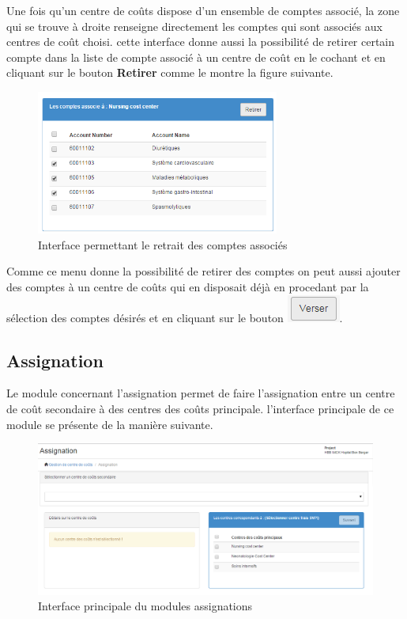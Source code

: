 \documentclass[12pt,a4paper]{report}
\begin{document}
Une fois qu'un centre de coûts dispose d'un ensemble de comptes associé, la zone qui se trouve à droite renseigne directement les comptes qui sont associés aux centres de coût choisi. cette interface donne aussi la possibilité de retirer certain compte dans la liste de compte associé à un centre de coût en le cochant et en cliquant sur le bouton \textbf{Retirer} comme le montre la figure suivante.

\begin{figure}[h]
\begin{center}
\includegraphics[width=8cm]{pic/CompteAssocie.png}
\end{center}
\caption{Interface permettant le retrait des comptes associés}
\label{Interface permettant le retrait des comptes associés}
\end{figure}

Comme ce menu donne la possibilité de retirer des comptes on peut aussi ajouter des comptes à un centre de coûts qui en disposait déjà en procedant par la sélection des comptes désirés et en cliquant sur le bouton \includegraphics[scale=0.7]{pic/VerserCompte.png}.
\newpage
\subsection{Assignation}
Le module concernant l'assignation permet de faire l'assignation entre un centre de coût secondaire à des centres des coûts principale. l'interface principale de ce module se présente de la manière suivante. 

\begin{figure}[h]
\begin{center}
\includegraphics[width=12cm]{pic/AssignationInterface.png}
\end{center}
\caption{Interface principale du modules assignations}
\label{Interface principale du modules assignations}
\end{figure}
\end{document}
